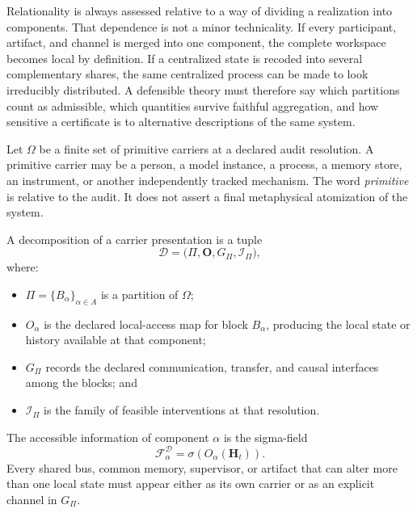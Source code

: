 
Relationality is always assessed relative to a way of dividing a realization
into components. That dependence is not a minor technicality. If every
participant, artifact, and channel is merged into one component, the complete
workspace becomes local by definition. If a centralized state is recoded into
several complementary shares, the same centralized process can be made to look
irreducibly distributed. A defensible theory must therefore say which
partitions count as admissible, which quantities survive faithful aggregation,
and how sensitive a certificate is to alternative descriptions of the same
system.


Let \(\Omega\) be a finite set of primitive carriers at a declared audit
resolution. A primitive carrier may be a person, a model instance, a process,
a memory store, an instrument, or another independently tracked mechanism.
The word \emph{primitive} is relative to the audit. It does not assert a final
metaphysical atomization of the system.

\begin{definition}\label{def:system-decomposition}
A decomposition of a carrier presentation is a tuple
\[
\mathcal D
=
\bigl(
\Pi,\mathbf O,G_{\Pi},\mathcal I_{\Pi}
\bigr),
\]
where:
\begin{itemize}
\item \(\Pi=\{B_\alpha\}_{\alpha\in A}\) is a partition of \(\Omega\);
\item \(O_\alpha\) is the declared local-access map for block \(B_\alpha\),
 producing the local state or history available at that component;
\item \(G_{\Pi}\) records the declared communication, transfer, and causal
 interfaces among the blocks; and
\item \(\mathcal I_{\Pi}\) is the family of feasible interventions at that
 resolution.
\end{itemize}
The accessible information of component \(\alpha\) is the sigma-field
\[
\mathscr F_\alpha^{\mathcal D}
=
\sigma\!\left(O_\alpha(\mathbf H_t)\right).
\]
Every shared bus, common memory, supervisor, or artifact that can alter more
than one local state must appear either as its own carrier or as an explicit
channel in \(G_{\Pi}\).
\end{definition}

